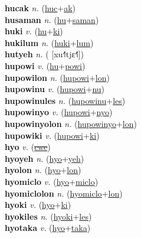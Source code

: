 \textbf{hucak} \textit{n.} (\hyperref[huc]{huc}+\hyperref[ak]{ak})
 \label{hucak} \\
\textbf{husaman} \textit{n.} (\hyperref[hu]{hu}+\hyperref[saman]{saman})
 \label{husaman} \\
\textbf{huki} \textit{v.} (\hyperref[hu]{hu}+\hyperref[ki]{ki})
 \label{huki} \\
\textbf{hukilum} \textit{n.} (\hyperref[huki]{huki}+\hyperref[lum]{lum})
 \label{hukilum} \\
\textbf{hutyeh} \textit{n.} ( [xu˧˥tjɛ˧˥])
 \label{hutyeh} \\
\textbf{hupowi} \textit{v.} (\hyperref[hu]{hu}+\hyperref[powi]{powi})
 \label{hupowi} \\
\textbf{hupowilon} \textit{n.} (\hyperref[hupowi]{hupowi}+\hyperref[lon]{lon})
 \label{hupowilon} \\
\textbf{hupowinu} \textit{v.} (\hyperref[hupowi]{hupowi}+\hyperref[nu]{nu})
 \label{hupowinu} \\
\textbf{hupowinules} \textit{n.} (\hyperref[hupowinu]{hupowinu}+\hyperref[les]{les})
 \label{hupowinules} \\
\textbf{hupowinyo} \textit{v.} (\hyperref[hupowi]{hupowi}+\hyperref[nyo]{nyo})
 \label{hupowinyo} \\
\textbf{hupowinyolon} \textit{n.} (\hyperref[hupowinyo]{hupowinyo}+\hyperref[lon]{lon})
 \label{hupowinyolon} \\
\textbf{hupowiki} \textit{v.} (\hyperref[hupowi]{hupowi}+\hyperref[ki]{ki})
 \label{hupowiki} \\
\textbf{hyo} \textit{v.} (\hyperref[cwe]{\sout{cwe}})
 \label{hyo} \\
\textbf{hyoyeh} \textit{n.} (\hyperref[hyo]{hyo}+\hyperref[yeh]{yeh})
 \label{hyoyeh} \\
\textbf{hyolon} \textit{n.} (\hyperref[hyo]{hyo}+\hyperref[lon]{lon})
 \label{hyolon} \\
\textbf{hyomiclo} \textit{v.} (\hyperref[hyo]{hyo}+\hyperref[miclo]{miclo})
 \label{hyomiclo} \\
\textbf{hyomiclolon} \textit{n.} (\hyperref[hyomiclo]{hyomiclo}+\hyperref[lon]{lon})
 \label{hyomiclolon} \\
\textbf{hyoki} \textit{v.} (\hyperref[hyo]{hyo}+\hyperref[ki]{ki})
 \label{hyoki} \\
\textbf{hyokiles} \textit{n.} (\hyperref[hyoki]{hyoki}+\hyperref[les]{les})
 \label{hyokiles} \\
\textbf{hyotaka} \textit{v.} (\hyperref[hyo]{hyo}+\hyperref[taka]{taka})
